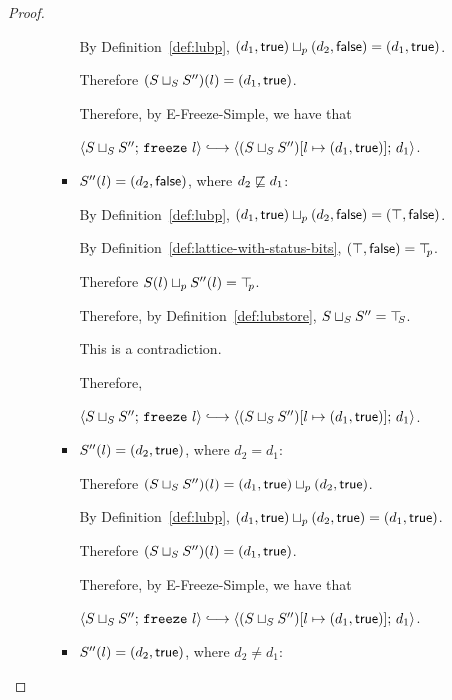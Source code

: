 \begin{proof}
\begin{itemize}
\begin{itemize}
\begin{itemize}
          By Definition~\ref{def:lubp},
          $(d_1, \textsf{true}) \sqcup_p (d_2, \textsf{false}) =
          (d_1, \textsf{true})$.

          Therefore $(S \sqcup_{S} S'')(l) =
          (d_1, \textsf{true})$.

          Therefore, by {\sc E-Freeze-Simple}, we have that

          $\config{\lubstore{S}{S''}}{\freeze{l}}
          \parstepsto
          \config{\extS{(\lubstore{S}{S''})}{l}{d_1}{\frozentrue}}{d_1}$.

        \item $S''(l) = (d_2, \textsf{false})$, where $d_2 \not \sqsubseteq d_1$:

          By Definition~\ref{def:lubp},
          $(d_1, \textsf{true}) \sqcup_p (d_2, \textsf{false})
          = (\top, \textsf{false})$.

          By Definition~\ref{def:lattice-with-status-bits},
          $(\top, \textsf{false}) = \top\hspace{-0.85mm}_{p}$.

          Therefore $S(l) \sqcup_p S''(l) = \top\hspace{-0.85mm}_{p}$.

          Therefore, by Definition~\ref{def:lubstore},
          $S \sqcup_{S} S'' = \top\hspace{-0.85mm}_{S}$.

          This is a contradiction.

          Therefore,

          $\config{\lubstore{S}{S''}}{\freeze{l}}
          \parstepsto
          \config{\extS{(\lubstore{S}{S''})}{l}{d_1}{\frozentrue}}{d_1}$.

        \item $S''(l) = (d_2, \textsf{true})$, where $d_2 = d_1$:

          Therefore $(S \sqcup_{S} S'')(l) =
          (d_1, \textsf{true}) \sqcup_p (d_2, \textsf{true})$.

          By Definition~\ref{def:lubp},
          $(d_1, \textsf{true}) \sqcup_p (d_2, \textsf{true}) =
          (d_1, \textsf{true})$.

          Therefore $(S \sqcup_{S} S'')(l) =
          (d_1, \textsf{true})$.

          Therefore, by {\sc E-Freeze-Simple}, we have that

          $\config{\lubstore{S}{S''}}{\freeze{l}}
          \parstepsto
          \config{\extS{(\lubstore{S}{S''})}{l}{d_1}{\frozentrue}}{d_1}$.

        \item $S''(l) = (d_2, \textsf{true})$, where $d_2 \neq d_1$:


\end{itemize}
\end{itemize}
\end{itemize}
\end{proof}
